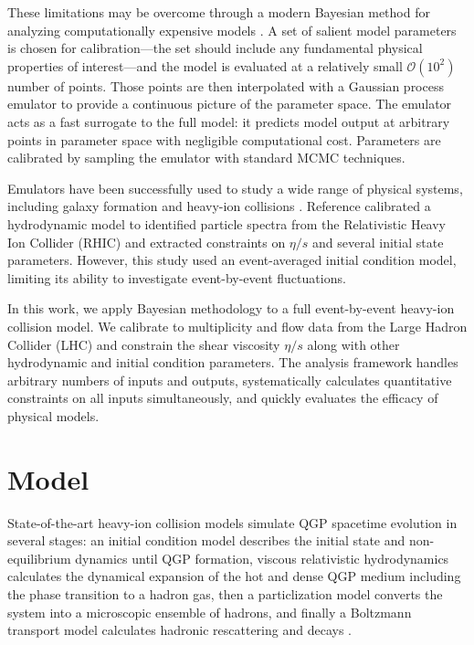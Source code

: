 \documentclass[aps,prc,reprint,superscriptaddress,amsmath]{revtex4-1}
\newcommand{\order}[1]{$\mathcal O(10^{#1})$}
\begin{document}
These limitations may be overcome through a modern Bayesian method for analyzing computationally expensive models \cite{OHagan:2006ba,Higdon:2008cmc,Higdon:2014tva}.
A set of salient model parameters is chosen for calibration---the set should include any fundamental physical properties of interest---and the model is evaluated at a relatively small \order 2 number of points.
Those points are then interpolated with a Gaussian process emulator \cite{Rasmussen:2006gp} to provide a continuous picture of the parameter space.
The emulator acts as a fast surrogate to the full model:
it predicts model output at arbitrary points in parameter space with negligible computational cost.
Parameters are calibrated by sampling the emulator with standard MCMC techniques.

Emulators have been successfully used to study a wide range of physical systems, including galaxy formation \cite{Gomez:2012ak} and heavy-ion collisions \cite{Novak:2013bqa,Pratt:2014cza,Pratt:2015zsa}.
Reference \cite{Novak:2013bqa} calibrated a hydrodynamic model to identified particle spectra from the Relativistic Heavy Ion Collider (RHIC) and extracted constraints on $\eta/s$ and several initial state parameters.
However, this study used an event-averaged initial condition model, limiting its ability to investigate event-by-event fluctuations.

In this work, we apply Bayesian methodology to a full event-by-event heavy-ion collision model.
We calibrate to multiplicity and flow data from the Large Hadron Collider (LHC) and constrain the shear viscosity $\eta/s$ along with other hydrodynamic and initial condition parameters.
The analysis framework handles arbitrary numbers of inputs and outputs, systematically calculates quantitative constraints on all inputs simultaneously, and quickly evaluates the efficacy of physical models.


\section{Model}

State-of-the-art heavy-ion collision models simulate QGP spacetime evolution in several stages:
an initial condition model describes the initial state and non-equilibrium dynamics until QGP formation, viscous relativistic hydrodynamics calculates the dynamical expansion of the hot and dense QGP medium including the phase transition to a hadron gas, then
a particlization model converts the system into a microscopic ensemble of hadrons, and finally a Boltzmann transport model calculates hadronic rescattering and decays \cite{Bass:2000ib,Teaney:2001av,Hirano:2005xf,Nonaka:2006yn,Petersen:2008dd,Song:2010mg,Schenke:2010rr,Shen:2014vra}.
\end{document}
